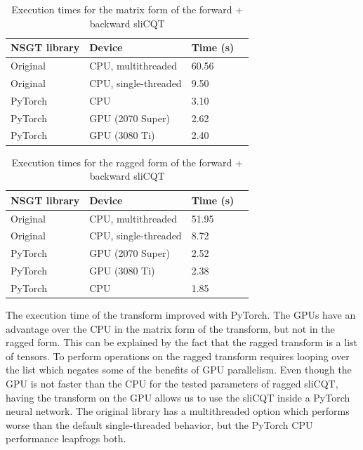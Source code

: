 \documentclass[report.tex]{subfiles}
\begin{document}
\begin{table}[ht]
	\centering
	\begin{tabular}{ |l|l|l|l| }
	 \hline
		NSGT library & Device & Time (s) \\
	 \hline
	 \hline
		Original & CPU, multithreaded & 60.56  \\
	 \hline
		Original & CPU, single-threaded & 9.50  \\
	 \hline
		PyTorch & CPU & 3.10  \\
	 \hline
		PyTorch & GPU (2070 Super) & 2.62 \\
	 \hline
		PyTorch & GPU (3080 Ti) &  2.40 \\
	 \hline
\end{tabular}
	\caption{Execution times for the matrix form of the forward + backward sliCQT}
	\label{table:nsgttorchresultsmatrix}
\end{table}

\begin{table}[ht]
	\centering
	\begin{tabular}{ |l|l|l|l| }
	 \hline
		NSGT library & Device & Time (s) \\
	 \hline
	 \hline
		Original & CPU, multithreaded & 51.95  \\
	 \hline
		Original & CPU, single-threaded & 8.72  \\
	 \hline
		PyTorch & GPU (2070 Super) & 2.52 \\
	 \hline
		PyTorch & GPU (3080 Ti) &  2.38 \\
	 \hline
		PyTorch & CPU & 1.85  \\
	 \hline
\end{tabular}
	\caption{Execution times for the ragged form of the forward + backward sliCQT}
	\label{table:nsgttorchresultsragged}
\end{table}

The execution time of the transform improved with PyTorch. The GPUs have an advantage over the CPU in the matrix form of the transform, but not in the ragged form. This can be explained by the fact that the ragged transform is a list of tensors. To perform operations on the ragged transform requires looping over the list which negates some of the benefits of GPU parallelism. Even though the GPU is not faster than the CPU for the tested parameters of ragged sliCQT, having the transform on the GPU allows us to use the sliCQT inside a PyTorch neural network. The original library has a multithreaded option which performs worse than the default single-threaded behavior, but the PyTorch CPU performance leapfrogs both.
\end{document}
